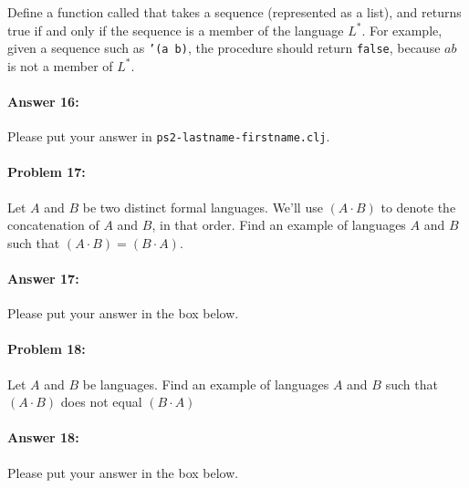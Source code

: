\documentclass[10pt]{article}
\newenvironment{AnswerBox}{\begin{mdframed}[style=simple]}{\end{mdframed}}
\newcommand{\required}[1]{{\color{blue}{#1}}}
\newcommand{\PSnum}{2}
\begin{document}
Define a function called \required{\texttt{in-L-star?}} that takes a sequence
(represented as a list), and returns true if and only if the sequence is a
member of the language $L^*$. For example, given a sequence such as \texttt{'(a
b)}, the procedure should return \texttt{false}, because $ab$ is not a member of
$L^*$.

\paragraph{Answer 16:} Please put your answer in
\texttt{ps\PSnum-lastname-firstname.clj}.

\noindent\hrulefill %

\paragraph{Problem 17:}
Let $A$ and $B$ be two distinct formal languages. We'll use $(A\cdot B)$ to
denote the concatenation of $A$ and $B$, in that order. Find an example of
languages $A$ and $B$ such that $(A\cdot B)=(B\cdot A)$.

\paragraph{Answer 17:} Please put your answer in the box below.

\begin{AnswerBox}%


\end{AnswerBox}%

\noindent\hrulefill %

\paragraph{Problem 18:}
Let $A$ and $B$ be languages. Find an example of languages $A$ and $B$ such that
$(A\cdot B)$ does not equal $(B\cdot A)$

\paragraph{Answer 18:} Please put your answer in the box below.

\begin{AnswerBox}%


\end{AnswerBox}%
\end{document}
